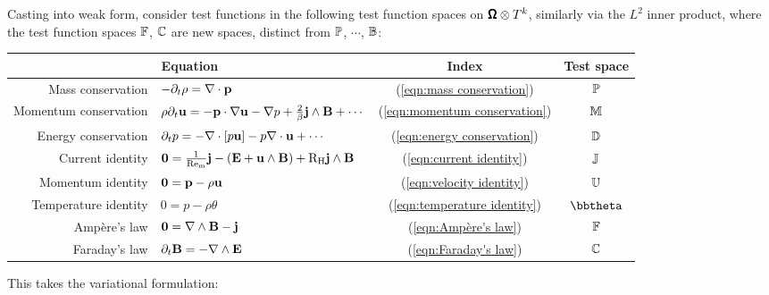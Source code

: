     Casting into weak form, consider test functions in the following test function spaces on $\pmb{\mathsf{\Omega}}\otimes T^{k}$, similarly via the $L^{2}$ inner product, where the test function spaces $\mathbb{F}$, $\mathbb{C}$ are new spaces, distinct from $\mathbb{P}$, $\cdots$, $\mathbb{B}$:
    \begin{center}\begin{tabular}{ r l c | c }
        \multicolumn{2}{c}{Equation}  &  Index  &  Test space  \\
        \hline\hline
        Mass conservation  &  $- \partial_{t}\rho  =  \nabla\cdot\mathbf{p}$  &  (\ref{eqn:mass conservation})  &  $\mathbb{P}$  \\
        Momentum conservation  &  $\rho\partial_{t}\mathbf{u} 
         =  - \mathbf{p}\cdot\nabla\mathbf{u} - \nabla p + \frac{2}{\beta}\mathbf{j}\wedge\mathbf{B} + \cdots$  &  (\ref{eqn:momentum conservation})  &  $\mathbb{M}$  \\
        Energy conservation  &  $\partial_{t}p  =  - \nabla\cdot[p\mathbf{u}] - p\nabla\cdot\mathbf{u} + \cdots$  &  (\ref{eqn:energy conservation})  &  $\mathbb{D}$  \\
        \hline
        Current identity  &  $\mathbf{0}  =  \frac{1}{\mathrm{Re}_{\mathrm{m}}}\mathbf{j} - (\mathbf{E} + \mathbf{u}\wedge\mathbf{B}) + \mathrm{R}_{\mathrm{H}}\mathbf{j}\wedge\mathbf{B}$  &  (\ref{eqn:current identity})  &  $\mathbb{J}$  \\
        \hline
        Momentum identity  &  $\mathbf{0}  =  \mathbf{p} - \rho\mathbf{u}$  &  (\ref{eqn:velocity identity})  &  $\mathbb{U}$  \\
        Temperature identity  &  $0  =  p - \rho\theta$  &  (\ref{eqn:temperature identity})  &  $\bbtheta$  \\
        \hline
        Ampère's law  &  $\mathbf{0}  =  \nabla\wedge\mathbf{B} - \mathbf{j}$  &  (\ref{eqn:Ampère's law})  &  $\mathbb{F}$  \\
        Faraday's law  &  $\partial_{t}\mathbf{B}  =  - \nabla\wedge\mathbf{E}$  &  (\ref{eqn:Faraday's law})  &  $\mathbb{C}$  \\
    \end{tabular}\end{center}
     This takes the variational formulation:
    
    \line


